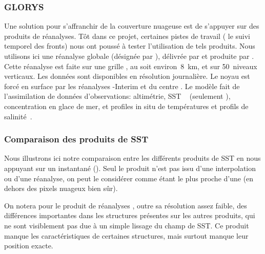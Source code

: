 \subsubsection{GLORYS}

Une solution pour s'affranchir de la couverture nuageuse est de s'appuyer sur des produits de réanalyses.
Tôt dans ce projet, certaines pistes de travail ( le suivi temporel des fronts) nous ont poussé à tester l'utilisation de tels produits.
Nous utilisons ici une réanalyse globale (désignée par ), délivrée par  et produite par .
Cette réanalyse est faite sur une grille , au  soit environ~\qty{8}{\km}, et sur 50~niveaux verticaux. Les données sont disponibles en résolution journalière.
Le noyau  est forcé en surface par les réanalyses -Interim et  du centre .
Le modèle fait de l'assimilation de données d'observations: altimétrie, SST ~ (seulement ), concentration en glace de mer, et profiles in situ de températures et profils de salinité~.

\subsubsection{Comparaison des produits de SST}

\begin{figure}
  \label{fig:comparaison-sst}
\end{figure}

Nous illustrons ici notre comparaison entre les différents produits de SST en nous appuyant sur un instantané ().
Seul le produit  n'est pas issu d'une interpolation ou d'une réanalyse, on peut le considérer comme étant le plus proche d'une  (en dehors des pixels nuageux bien sûr).

On notera pour le produit de réanalyses , outre sa résolution assez faible, des différences importantes dans les structures présentes sur les autres produits, qui ne sont visiblement pas due à un simple lissage du champ de SST.
Ce produit manque les caractéristiques de certaines structures, mais surtout manque leur position exacte.

